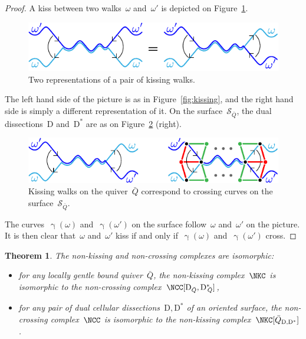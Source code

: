 \documentclass{amsart}
\newtheorem{theorem}{Theorem}[section]
\theoremstyle{definition}
\newcommand{\fref}[1]{Figure~\ref{#1}} %
\newcommand{\surface}{\mathcal{S}} %
\newcommand{\dual}{^*} %
\newcommand{\dissection}{\mathrm{D}} %
\newcommand{\curveof}{\operatorname{\gamma}} %
\begin{document}
\begin{proof}
A kiss between two walks~$\omega$ and~$\omega'$ is depicted on \fref{fig:kissings}.

\begin{figure}[h]
	\capstart
	\centerline{\includegraphics[scale=1]{kissings}}
	\caption{Two representations of a pair of kissing walks.}
	\label{fig:kissings}
\end{figure}
The left hand side of the picture is as in \fref{fig:kissing}, and the right hand side is simply a different representation of it.
On the surface~$\surface_{\bar Q}$, the dual dissections~$\dissection$ and~$\dissection\dual$ are as on \fref{fig:kissingVSCrossing} (right).

\begin{figure}[h]
	\capstart
	\centerline{\includegraphics[scale=1]{kissingVSCrossing}}
	\caption{Kissing walks on the quiver~$\bar Q$ correspond to crossing curves on the surface~$\surface_{\bar Q}$.}
	\label{fig:kissingVSCrossing}
\end{figure}

The curves~$\curveof(\omega)$ and~$\curveof(\omega')$ on the surface follow~$\omega$ and~$\omega'$ on the picture.
It is then clear that~$\omega$ and~$\omega'$ kiss if and only if~$\curveof(\omega)$ and~$\curveof(\omega')$ cross. 
\end{proof}

\begin{theorem}
\label{thm:complexesCoincide}
The non-kissing and non-crossing complexes are isomorphic:
\begin{itemize}
\item for any locally gentle bound quiver~$\bar Q$, the non-kissing complex~$\NKC$ is isomorphic to the non-crossing complex~$\NCC[\dissection_{\bar Q}, {\dissection\dual\!\!_{\bar Q}}]$,%
\item for any pair of dual cellular dissections~$\dissection, \dissection\dual$ of an oriented surface, the non-crossing complex~$\NCC$ is isomorphic to the non-kissing complex~$\NKC[\bar Q_{\dissection, \dissection\dual}]$.

\end{itemize}
\end{theorem}
\end{document}
